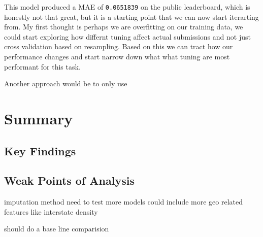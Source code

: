 \documentclass[]{book}
\theoremstyle{definition}
\theoremstyle{definition}
\theoremstyle{definition}
\theoremstyle{remark}
\begin{document}
This model produced a MAE of \texttt{0.0651839} on the public
leaderboard, which is honestly not that great, but it is a starting
point that we can now start iterarting from. My first thought is perhaps
we are overfitting on our training data, we could start exploring how
differnt tuning affect actual submissions and not just cross validation
based on resampling. Based on this we can tract how our performance
changes and start narrow down what what tuning are most performant for
this task.

Another approach would be to only use

\chapter{Summary}\label{summary}

\section{Key Findings}\label{key-findings}

\section{Weak Points of Analysis}\label{weak-points-of-analysis}

imputation method need to test more models could include more geo
related features like interstate density

should do a base line comparision


\end{document}
